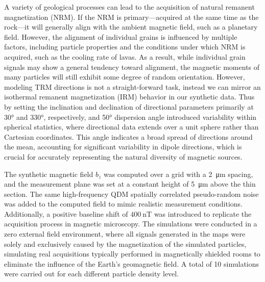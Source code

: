 A variety of geological processes can lead to the acquisition of natural remanent magnetization (NRM). If the NRM is primary—acquired at the same time as the rock—it will generally align with the ambient magnetic field, such as a planetary field. However, the alignment of individual grains is influenced by multiple factors, including particle properties \citep[shape, size, domain state,][]{Bellon2025} and the conditions under which NRM is acquired, such as the cooling rate of lavas. As a result, while individual grain signals may show a general tendency toward alignment, the magnetic moments of many particles will still exhibit some degree of random orientation. However, modeling TRM directions is not a straight-forward task, instead we can mirror an isothermal remanent magnetization (IRM) behavior in our synthetic data. Thus by setting the inclination and declination of directional parameters primarily at 30° and 330°, respectively, and 50° dispersion angle introduced variability within spherical statistics, where directional data extends over a unit sphere rather than Cartesian coordinates. This angle indicates a broad spread of directions around the mean, accounting for significant variability in dipole directions, which is crucial for accurately representing the natural diversity of magnetic sources.

The synthetic magnetic field \(b_z\) was computed over a grid with a \qty{2}{\um} spacing, and the measurement plane was set at a constant height of \qty{5}{\um} above the thin section. The same high-frequency QDM spatially correlated pseudo-random noise was added to the computed field to mimic realistic measurement conditions. Additionally, a positive baseline shift of \(\qty{400}{\nano\tesla}\) \citep[following][]{Hess2024} was introduced to replicate the acquisition process in magnetic microscopy. The simulations were conducted in a zero external field environment, where all signals generated in the maps were solely and exclusively caused by the magnetization of the simulated particles, simulating real acquisitions typically performed in magnetically shielded rooms to eliminate the influence of the Earth's geomagnetic field. A total of 10 simulations were carried out for each different particle density level.

